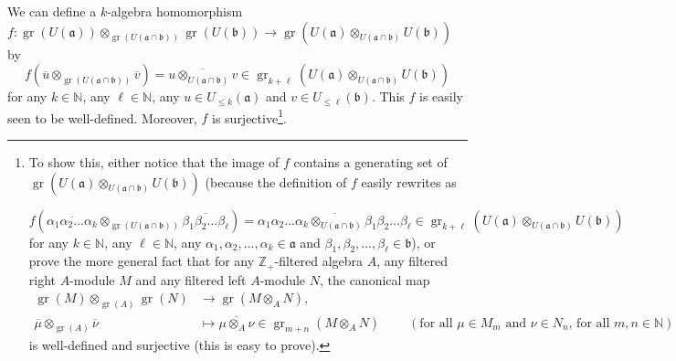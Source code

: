 \documentclass[etingof-lie.tex]{subfiles}
\begin{document}
We can define a $k$-algebra homomorphism $f:\operatorname*{gr}\left(  U\left(
\mathfrak{a}\right)  \right)  \otimes_{\operatorname*{gr}\left(  U\left(
\mathfrak{a}\cap\mathfrak{b}\right)  \right)  }\operatorname*{gr}\left(
U\left(  \mathfrak{b}\right)  \right)  \rightarrow\operatorname*{gr}\left(
U\left(  \mathfrak{a}\right)  \otimes_{U\left(  \mathfrak{a}\cap
\mathfrak{b}\right)  }U\left(  \mathfrak{b}\right)  \right)  $ by
\[
f\left(  \overline{u}\otimes_{\operatorname*{gr}\left(  U\left(
\mathfrak{a}\cap\mathfrak{b}\right)  \right)  }\overline{v}\right)
=\overline{u\otimes_{U\left(  \mathfrak{a}\cap\mathfrak{b}\right)  }v}%
\in\operatorname*{gr}\nolimits_{k+\ell}\left(  U\left(  \mathfrak{a}\right)
\otimes_{U\left(  \mathfrak{a}\cap\mathfrak{b}\right)  }U\left(
\mathfrak{b}\right)  \right)
\]
for any $k\in\mathbb{N}$, any $\ell\in\mathbb{N}$, any $u\in U_{\leq k}\left(
\mathfrak{a}\right)  $ and $v\in U_{\leq\ell}\left(  \mathfrak{b}\right)  $.
This $f$ is easily seen to be well-defined. Moreover, $f$ is
surjective\footnote{To show this, either notice that the image of $f$ contains
a generating set of $\operatorname*{gr}\left(  U\left(  \mathfrak{a}\right)
\otimes_{U\left(  \mathfrak{a}\cap\mathfrak{b}\right)  }U\left(
\mathfrak{b}\right)  \right)  $ (because the definition of $f$ easily rewrites
as
\par%
\[
f\left(  \overline{\alpha_{1}\alpha_{2}...\alpha_{k}}\otimes
_{\operatorname*{gr}\left(  U\left(  \mathfrak{a}\cap\mathfrak{b}\right)
\right)  }\overline{\beta_{1}\beta_{2}...\beta_{\ell}}\right)  =\overline
{\alpha_{1}\alpha_{2}...\alpha_{k}\otimes_{U\left(  \mathfrak{a}%
\cap\mathfrak{b}\right)  }\beta_{1}\beta_{2}...\beta_{\ell}}\in
\operatorname*{gr}\nolimits_{k+\ell}\left(  U\left(  \mathfrak{a}\right)
\otimes_{U\left(  \mathfrak{a}\cap\mathfrak{b}\right)  }U\left(
\mathfrak{b}\right)  \right)
\]
for any $k\in\mathbb{N}$, any $\ell\in\mathbb{N}$, any $\alpha_{1},\alpha
_{2},...,\alpha_{k}\in\mathfrak{a}$ and $\beta_{1},\beta_{2},...,\beta_{\ell
}\in\mathfrak{b}$), or prove the more general fact that for any $\mathbb{Z}%
_{+}$-filtered algebra $A$, any filtered right $A$-module $M$ and any filtered
left $A$-module $N$, the canonical map%
\begin{align*}
\operatorname*{gr}\left(  M\right)  \otimes_{\operatorname*{gr}\left(
A\right)  }\operatorname*{gr}\left(  N\right)   &  \rightarrow
\operatorname*{gr}\left(  M\otimes_{A}N\right)  ,\\
\overline{\mu}\otimes_{\operatorname*{gr}\left(  A\right)  }\overline{\nu}  &
\mapsto\overline{\mu\otimes_{A}\nu}\in\operatorname*{gr}\nolimits_{m+n}\left(
M\otimes_{A}N\right)  \ \ \ \ \ \ \ \ \ \ \left(  \text{for all }\mu\in
M_{m}\text{ and }\nu\in N_{n}\text{, for all }m,n\in\mathbb{N}\right)
\end{align*}
is well-defined and surjective (this is easy to prove).}.
\end{document}
